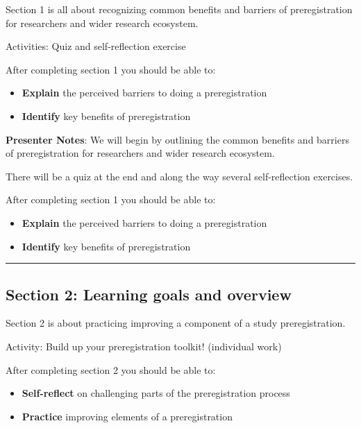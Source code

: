 \documentclass[
  letterpaper,
  DIV=11,
  numbers=noendperiod]{scrartcl}
\providecommand{\tightlist}{%
  \setlength{\itemsep}{0pt}\setlength{\parskip}{0pt}}
\begin{document}
Section 1 is all about recognizing common benefits and barriers of
preregistration for researchers and wider research ecosystem.

Activities: Quiz and self-reflection exercise

After completing section 1 you should be able to:

\begin{itemize}
\tightlist
\item
  \textbf{Explain} the perceived barriers to doing a preregistration
\item
  \textbf{Identify} key benefits of preregistration
\end{itemize}

\textbf{Presenter Notes}: We will begin by outlining the common benefits
and barriers of preregistration for researchers and wider research
ecosystem.

There will be a quiz at the end and along the way several
self-reflection exercises.

After completing section 1 you should be able to:

\begin{itemize}
\tightlist
\item
  \textbf{Explain} the perceived barriers to doing a preregistration
\item
  \textbf{Identify} key benefits of preregistration
\end{itemize}

\begin{center}\rule{0.5\linewidth}{0.5pt}\end{center}

\subsection{Section 2: Learning goals and
overview}\label{section-2-learning-goals-and-overview}

Section 2 is about practicing improving a component of a study
preregistration.

Activity: Build up your preregistration toolkit! (individual work)

After completing section 2 you should be able to:

\begin{itemize}
\tightlist
\item
  \textbf{Self-reflect} on challenging parts of the preregistration
  process
\item
  \textbf{Practice} improving elements of a preregistration
\end{itemize}
\end{document}
